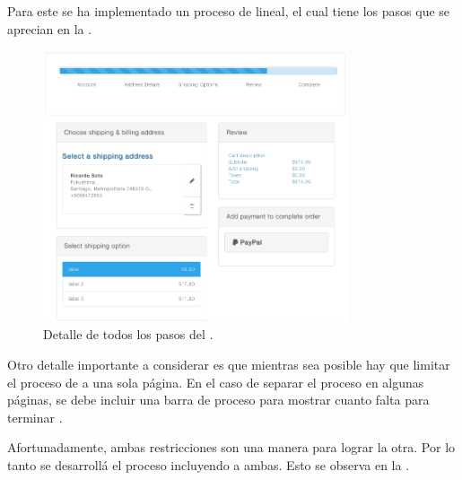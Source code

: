 	Para este \frameworkPC se ha implementado un proceso de \checkoutEF lineal, el cual tiene los pasos que se aprecian en la .


	\begin{figure}[H]
		\centering
		\includegraphics[width=0.8\textwidth]{figuras/checkout/steps_current_payment.png}
		\caption{Detalle de todos los pasos del \workflowCPT \shippingEF.}
		\label{figure:checkout:steps}
	\end{figure}

	Otro detalle importante a considerar es que mientras sea posible hay que limitar el proceso de \checkoutEF a una sola página. En el caso de separar el proceso en algunas páginas, se debe incluir una barra de proceso para mostrar cuanto falta para terminar \cite{online_official_imediaconnection_best_practices_shopping_cart}.

	Afortunadamente, ambas restricciones son una manera para lograr la otra. Por lo tanto se desarrollá el proceso incluyendo a ambas. Esto se observa en la .

